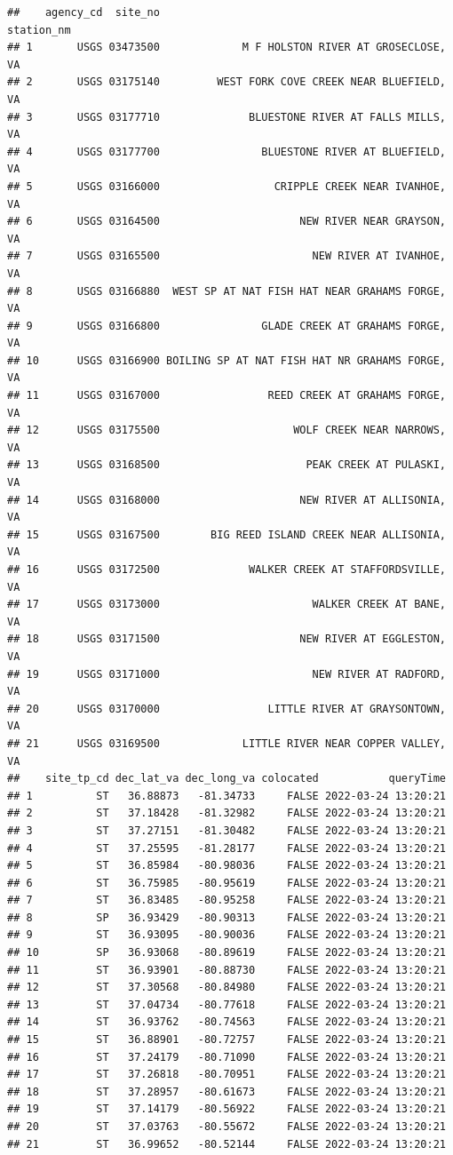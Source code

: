 \documentclass[
]{book}
\begin{document}
\begin{verbatim}
##    agency_cd  site_no                                      station_nm
## 1       USGS 03473500             M F HOLSTON RIVER AT GROSECLOSE, VA
## 2       USGS 03175140         WEST FORK COVE CREEK NEAR BLUEFIELD, VA
## 3       USGS 03177710              BLUESTONE RIVER AT FALLS MILLS, VA
## 4       USGS 03177700                BLUESTONE RIVER AT BLUEFIELD, VA
## 5       USGS 03166000                  CRIPPLE CREEK NEAR IVANHOE, VA
## 6       USGS 03164500                      NEW RIVER NEAR GRAYSON, VA
## 7       USGS 03165500                        NEW RIVER AT IVANHOE, VA
## 8       USGS 03166880  WEST SP AT NAT FISH HAT NEAR GRAHAMS FORGE, VA
## 9       USGS 03166800                GLADE CREEK AT GRAHAMS FORGE, VA
## 10      USGS 03166900 BOILING SP AT NAT FISH HAT NR GRAHAMS FORGE, VA
## 11      USGS 03167000                 REED CREEK AT GRAHAMS FORGE, VA
## 12      USGS 03175500                     WOLF CREEK NEAR NARROWS, VA
## 13      USGS 03168500                       PEAK CREEK AT PULASKI, VA
## 14      USGS 03168000                      NEW RIVER AT ALLISONIA, VA
## 15      USGS 03167500        BIG REED ISLAND CREEK NEAR ALLISONIA, VA
## 16      USGS 03172500              WALKER CREEK AT STAFFORDSVILLE, VA
## 17      USGS 03173000                        WALKER CREEK AT BANE, VA
## 18      USGS 03171500                      NEW RIVER AT EGGLESTON, VA
## 19      USGS 03171000                        NEW RIVER AT RADFORD, VA
## 20      USGS 03170000                 LITTLE RIVER AT GRAYSONTOWN, VA
## 21      USGS 03169500             LITTLE RIVER NEAR COPPER VALLEY, VA
##    site_tp_cd dec_lat_va dec_long_va colocated           queryTime
## 1          ST   36.88873   -81.34733     FALSE 2022-03-24 13:20:21
## 2          ST   37.18428   -81.32982     FALSE 2022-03-24 13:20:21
## 3          ST   37.27151   -81.30482     FALSE 2022-03-24 13:20:21
## 4          ST   37.25595   -81.28177     FALSE 2022-03-24 13:20:21
## 5          ST   36.85984   -80.98036     FALSE 2022-03-24 13:20:21
## 6          ST   36.75985   -80.95619     FALSE 2022-03-24 13:20:21
## 7          ST   36.83485   -80.95258     FALSE 2022-03-24 13:20:21
## 8          SP   36.93429   -80.90313     FALSE 2022-03-24 13:20:21
## 9          ST   36.93095   -80.90036     FALSE 2022-03-24 13:20:21
## 10         SP   36.93068   -80.89619     FALSE 2022-03-24 13:20:21
## 11         ST   36.93901   -80.88730     FALSE 2022-03-24 13:20:21
## 12         ST   37.30568   -80.84980     FALSE 2022-03-24 13:20:21
## 13         ST   37.04734   -80.77618     FALSE 2022-03-24 13:20:21
## 14         ST   36.93762   -80.74563     FALSE 2022-03-24 13:20:21
## 15         ST   36.88901   -80.72757     FALSE 2022-03-24 13:20:21
## 16         ST   37.24179   -80.71090     FALSE 2022-03-24 13:20:21
## 17         ST   37.26818   -80.70951     FALSE 2022-03-24 13:20:21
## 18         ST   37.28957   -80.61673     FALSE 2022-03-24 13:20:21
## 19         ST   37.14179   -80.56922     FALSE 2022-03-24 13:20:21
## 20         ST   37.03763   -80.55672     FALSE 2022-03-24 13:20:21
## 21         ST   36.99652   -80.52144     FALSE 2022-03-24 13:20:21
\end{verbatim}
\end{document}

